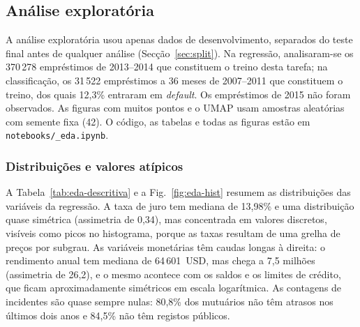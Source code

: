 
\subsection{Análise exploratória}
\label{sec:eda}

A análise exploratória usou apenas dados de desenvolvimento, separados do teste final
antes de qualquer análise (Secção~\ref{sec:split}). Na regressão, analisaram-se os
370\,278 empréstimos de 2013--2014 que constituem o treino desta tarefa; na
classificação, os 31\,522 empréstimos a 36 meses de 2007--2011 que constituem o treino,
dos quais 12,3\% entraram em \textit{default}. Os empréstimos de 2015 não foram
observados. As figuras com muitos pontos e o UMAP usam amostras aleatórias com semente
fixa (42). O código, as tabelas e todas as figuras estão em
\texttt{notebooks/\_eda.ipynb}.

\subsubsection{Distribuições e valores atípicos}

A Tabela~\ref{tab:eda-descritiva} e a Fig.~\ref{fig:eda-hist} resumem as distribuições
das variáveis da regressão. A taxa de juro tem mediana de 13,98\% e uma distribuição
quase simétrica (assimetria de 0,34), mas concentrada em valores discretos, visíveis
como picos no histograma, porque as taxas resultam de uma grelha de preços por subgrau.
As variáveis monetárias têm caudas longas à direita: o rendimento anual tem mediana de
64\,601~USD, mas chega a 7,5 milhões (assimetria de 26,2), e o mesmo acontece com os
saldos e os limites de crédito, que ficam aproximadamente simétricos em escala
logarítmica. As contagens de incidentes são quase sempre nulas: 80,8\% dos mutuários
não têm atrasos nos últimos dois anos e 84,5\% não têm registos públicos.

